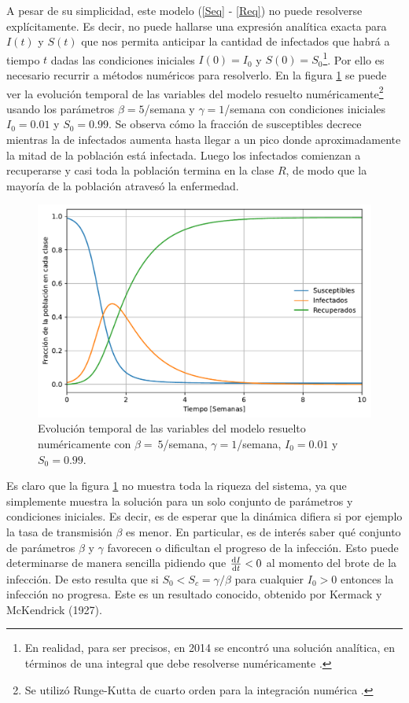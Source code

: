 A pesar de su simplicidad, este modelo (\ref{Seq} - \ref{Req}) no puede resolverse explícitamente. Es decir, no puede hallarse una expresión analítica exacta
para $I(t)$ y $S(t)$ que nos permita anticipar la cantidad de infectados que habrá a tiempo $t$ dadas las condiciones iniciales $I(0)=I_0$ y $S(0)=S_0$\footnote{En realidad,
para ser precisos, en 2014 se encontró una solución analítica, en términos de una integral que debe resolverse numéricamente \cite{sir_sol}.}.
Por ello
es necesario recurrir a métodos numéricos para resolverlo. En la figura \ref{fig:SIR} se puede ver la evolución temporal de las variables del modelo 
resuelto numéricamente\footnote{Se utilizó Runge-Kutta de cuarto orden para la integración numérica \cite{Recipes}.} usando los parámetros $\beta=5$/semana y
$\gamma=1$/semana con condiciones iniciales $I_0=0.01$ y $S_0=0.99$. Se observa cómo la fracción de susceptibles decrece mientras la de infectados 
aumenta hasta llegar a un pico donde aproximadamente la mitad de la población está infectada. Luego los infectados comienzan a recuperarse y casi toda
la población termina en la clase $R$, de modo que la mayoría de la población atravesó la enfermedad.

\begin{figure}[h]
  \centering
  \includegraphics[width=\imsize]{SIR.pdf}
  \caption[Solución numérica del modelo S-I-R]{Evolución temporal de las variables del modelo resuelto numéricamente 
  con $\beta=~5$/semana, $\gamma=1$/semana, $I_0=0.01$ y $S_0=0.99$.}
  \label{fig:SIR}
\end{figure}


Es claro que la figura \ref{fig:SIR} no muestra toda la riqueza del sistema, ya que simplemente muestra la solución para un solo conjunto de parámetros y 
condiciones iniciales. Es decir, es de esperar que la dinámica difiera si por ejemplo la tasa de transmisión $\beta$ es menor. En particular, es de 
interés saber qué conjunto de parámetros $\beta$ y $\gamma$ favorecen o dificultan el progreso de la infección. Esto puede determinarse de manera sencilla pidiendo que $\dv{I}{t}<0$ 
al momento del brote de la infección. De esto resulta que si $S_0<S_c=\gamma/\beta$ para cualquier $I_0>0$ entonces la infección no progresa. 
Este es un resultado conocido, obtenido por Kermack y McKendrick (1927).

